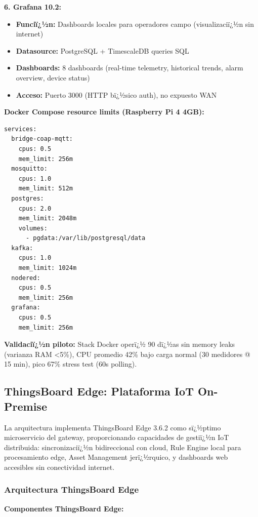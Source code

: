 \textbf{6. Grafana 10.2:}
\begin{itemize}
    \item \textbf{Funciï¿½n:} Dashboards locales para operadores campo (visualizaciï¿½n sin internet)
    \item \textbf{Datasource:} PostgreSQL + TimescaleDB queries SQL
    \item \textbf{Dashboards:} 8 dashboards (real-time telemetry, historical trends, alarm overview, device status)
    \item \textbf{Acceso:} Puerto 3000 (HTTP bï¿½sico auth), no expuesto WAN
\end{itemize}

\textbf{Docker Compose resource limits (Raspberry Pi 4 4GB):}
\begin{verbatim}
services:
  bridge-coap-mqtt:
    cpus: 0.5
    mem_limit: 256m
  mosquitto:
    cpus: 1.0
    mem_limit: 512m
  postgres:
    cpus: 2.0
    mem_limit: 2048m
    volumes:
      - pgdata:/var/lib/postgresql/data
  kafka:
    cpus: 1.0
    mem_limit: 1024m
  nodered:
    cpus: 0.5
    mem_limit: 256m
  grafana:
    cpus: 0.5
    mem_limit: 256m
\end{verbatim}

\textbf{Validaciï¿½n piloto:} Stack Docker operï¿½ 90 dï¿½as sin memory leaks (varianza RAM <5\%), CPU promedio 42\% bajo carga normal (30 medidores @ 15 min), pico 67\% stress test (60s polling).

\subsection{ThingsBoard Edge: Plataforma IoT On-Premise}
\label{sec:impl-thingsboard-edge}

La arquitectura implementa ThingsBoard Edge 3.6.2 como sï¿½ptimo microservicio del gateway, proporcionando capacidades de gestiï¿½n IoT distribuida: sincronizaciï¿½n bidireccional con cloud, Rule Engine local para procesamiento edge, Asset Management jerï¿½rquico, y dashboards web accesibles sin conectividad internet.

\subsubsection{Arquitectura ThingsBoard Edge}

\textbf{Componentes ThingsBoard Edge:}

